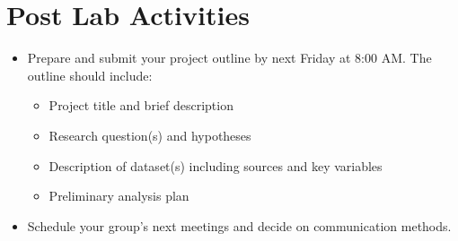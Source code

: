 \documentclass[12pt]{article}
\begin{document}
\section*{Post Lab Activities}

\begin{itemize}
    \item Prepare and submit your project outline by next Friday at 8:00 AM. The outline should include:  
    \begin{itemize}
        \item Project title and brief description  
        \item Research question(s) and hypotheses  
        \item Description of dataset(s) including sources and key variables  
        \item Preliminary analysis plan  
    \end{itemize}
    \item Schedule your group's next meetings and decide on communication methods.  
\end{itemize}
\end{document}
